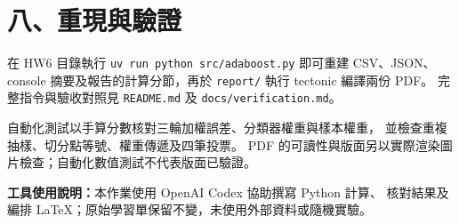 \section*{八、重現與驗證}
在 HW6 目錄執行 \texttt{uv run python src/adaboost.py} 即可重建 CSV、JSON、
console 摘要及報告的計算分節，再於 \texttt{report/} 執行 tectonic 編譯兩份 PDF。
完整指令與驗收對照見 \texttt{README.md} 及 \texttt{docs/verification.md}。

自動化測試以手算分數核對三輪加權誤差、分類器權重與樣本權重，
並檢查重複抽樣、切分點等號、權重傳遞及四筆投票。
PDF 的可讀性與版面另以實際渲染圖片檢查；自動化數值測試不代表版面已驗證。

\textbf{工具使用說明：}本作業使用 OpenAI Codex 協助撰寫 Python 計算、
核對結果及編排 LaTeX；原始學習單保留不變，未使用外部資料或隨機實驗。


